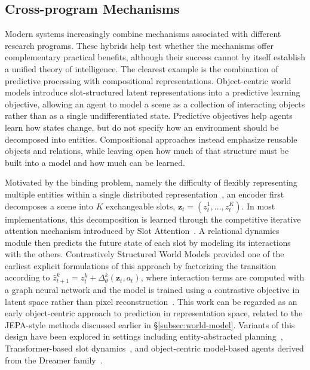 \documentclass[acmsmall,screen,review,anonymous]{acmart}
\begin{document}
\subsection{Cross-program Mechanisms}
\label{subsec:cross-program}
Modern systems increasingly combine mechanisms associated with different research programs.
%
These hybrids help test whether the mechanisms offer complementary practical benefits, although their success cannot by itself establish a unified theory of intelligence.
%
The clearest example is the combination of predictive processing with compositional representations.
%
Object-centric world models introduce slot-structured latent representations into a predictive learning objective, allowing an agent to model a scene as a collection of interacting objects rather than as a single undifferentiated state.
%
Predictive objectives help agents learn how states change, but do not specify how an environment should be decomposed into entities.
%
Compositional approaches instead emphasize reusable objects and relations, while leaving open how much of that structure must be built into a model and how much can be learned.

Motivated by the binding problem, namely the difficulty of flexibly representing multiple entities within a single distributed representation~\citep{greff2020binding}, an encoder first decomposes a scene into $K$ exchangeable slots, $\mathbf{z}_t = (z_t^1, \dots, z_t^K)$.
%
In most implementations, this decomposition is learned through the competitive iterative attention mechanism introduced by Slot Attention~\citep{locatello2020slot, jiang2024slot, jiang2023slot}.
%
A relational dynamics module then predicts the future state of each slot by modeling its interactions with the others.
%
Contrastively Structured World Models provided one of the earliest explicit formulations of this approach by factorizing the transition according to $\hat{z}_{t+1}^{k} = z_t^{k} + \Delta_\theta^{k}(\mathbf{z}_t, a_t)$, where interaction terms are computed with a graph neural network and the model is trained using a contrastive objective in latent space rather than pixel reconstruction~\citep{kipf2020cswm}.
%
This work can be regarded as an early object-centric approach to prediction in representation space, related to the JEPA-style methods discussed earlier in \S\ref{subsec:world-model}.
%
Variants of this design have been explored in settings including entity-abstracted planning~\citep{pmlr-v100-veerapaneni20a, zhao2022compositional, piriyakulkij2026poeworld}, Transformer-based slot dynamics~\citep{wu2023slotformerunsupervisedvisualdynamics}, and object-centric model-based agents derived from the Dreamer family~\citep{10.3389/fnbot.2025.1585386}.
\end{document}
